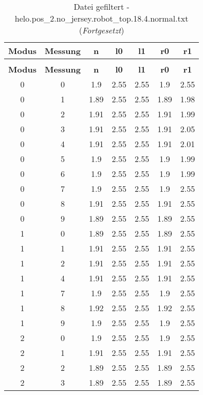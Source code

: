 \clearpage{}
\begin{longtable}{|c|c||c||c|c||c|c|}
	\caption{Datei gefiltert - helo.pos\_2.no\_jersey.robot\_top.18.4.normal.txt} \label{tab:helo.pos-2.no-jersey.robot-top.18.4.normal.txt} \\ \hline
	\textbf{Modus} & \textbf{Messung} & \textbf{n} & \textbf{l0} & \textbf{l1} & \textbf{r0} & \textbf{r1}\\ \hline
	\endfirsthead
	\caption[]{Datei gefiltert - helo.pos\_2.no\_jersey.robot\_top.18.4.normal.txt (\emph{Fortgesetzt})} \\ \hline
	\textbf{Modus} & \textbf{Messung} & \textbf{n} & \textbf{l0} & \textbf{l1} & \textbf{r0} & \textbf{r1}\\ \hline
	\endhead
	0 & 0 & 1.9 & 2.55 & 2.55 & 1.9 & 2.55 \\ \hline
	0 & 1 & 1.89 & 2.55 & 2.55 & 1.89 & 1.98 \\ \hline
	0 & 2 & 1.91 & 2.55 & 2.55 & 1.91 & 1.99 \\ \hline
	0 & 3 & 1.91 & 2.55 & 2.55 & 1.91 & 2.05 \\ \hline
	0 & 4 & 1.91 & 2.55 & 2.55 & 1.91 & 2.01 \\ \hline
	0 & 5 & 1.9 & 2.55 & 2.55 & 1.9 & 1.99 \\ \hline
	0 & 6 & 1.9 & 2.55 & 2.55 & 1.9 & 1.99 \\ \hline
	0 & 7 & 1.9 & 2.55 & 2.55 & 1.9 & 2.55 \\ \hline
	0 & 8 & 1.91 & 2.55 & 2.55 & 1.91 & 2.55 \\ \hline
	0 & 9 & 1.89 & 2.55 & 2.55 & 1.89 & 2.55 \\ \hline
	1 & 0 & 1.89 & 2.55 & 2.55 & 1.89 & 2.55 \\ \hline
	1 & 1 & 1.91 & 2.55 & 2.55 & 1.91 & 2.55 \\ \hline
	1 & 2 & 1.91 & 2.55 & 2.55 & 1.91 & 2.55 \\ \hline
	1 & 4 & 1.91 & 2.55 & 2.55 & 1.91 & 2.55 \\ \hline
	1 & 7 & 1.9 & 2.55 & 2.55 & 1.9 & 2.55 \\ \hline
	1 & 8 & 1.92 & 2.55 & 2.55 & 1.92 & 2.55 \\ \hline
	1 & 9 & 1.9 & 2.55 & 2.55 & 1.9 & 2.55 \\ \hline
	2 & 0 & 1.9 & 2.55 & 2.55 & 1.9 & 2.55 \\ \hline
	2 & 1 & 1.91 & 2.55 & 2.55 & 1.91 & 2.55 \\ \hline
	2 & 2 & 1.89 & 2.55 & 2.55 & 1.89 & 2.55 \\ \hline
	2 & 3 & 1.89 & 2.55 & 2.55 & 1.89 & 2.55 \\ \hline

\end{longtable}
